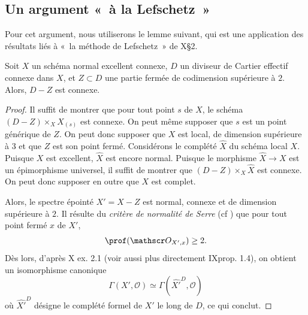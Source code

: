 \documentclass[10pt]{../fichiers-configuration-latex/smfart}
\begin{document}
\subsection{Un argument « à la Lefschetz »}

Pour cet argument, nous utiliserons le lemme suivant,
 qui est une application des résultats liés à « la méthode de
 Lefschetz » de  {X}{\S 2}.

\begin{lemme}\label{21-ref-deg-connexe}
Soit $X$ un schéma normal excellent connexe,
 $D$ un diviseur de Cartier effectif connexe dans $X$,
  et $Z \subset D$ une partie fermée de codimension supérieure à $2$.
Alors, $D-Z$ est connexe.
\end{lemme}

\begin{proof}
Il suffit de montrer que pour tout point $s$ de $X$, le schéma 
 $(D-Z) \times_X X_{(s)}$ est connexe.
On peut même supposer que $s$ est un point générique de $Z$.
On peut donc supposer que $X$ est local, de dimension supérieure à $3$
 et que $Z$ est son point fermé.
Considérons le complété $\hat X$ du schéma local $X$.
Puisque $X$ est excellent, $\hat X$ est encore normal.
Puisque le morphisme $\hat X \rightarrow X$ est un épimorphisme universel,
 il suffit de montrer que $(D-Z) \times_X \hat X$ est connexe.
On peut donc supposer en outre que $X$ est complet.
 
Alors, le spectre épointé $X'=X-Z$ est normal, connexe et 
de dimension supérieure à $2$. 
Il résulte du {\it critère de normalité de Serre}
(cf \cite[23.8]{CRT@Matsumura})
 que pour tout point fermé $x$ de $X'$,
$$\prof(\mathscr O_{X',x}) \geq 2.$$
Dès lors, d'après  X {ex. 2.1} (voir aussi plus directement
  {IX}{prop. 1.4}), on obtient un isomorphisme canonique
$$
\Gamma(X',\mathscr O) \simeq
 \Gamma\left(\widehat{X'}^D,\mathscr O\right)
$$
où $\widehat{X'}^D$ désigne le complété formel de $X'$ le long de $D$,
 ce qui conclut.
\end{proof}
\end{document}
